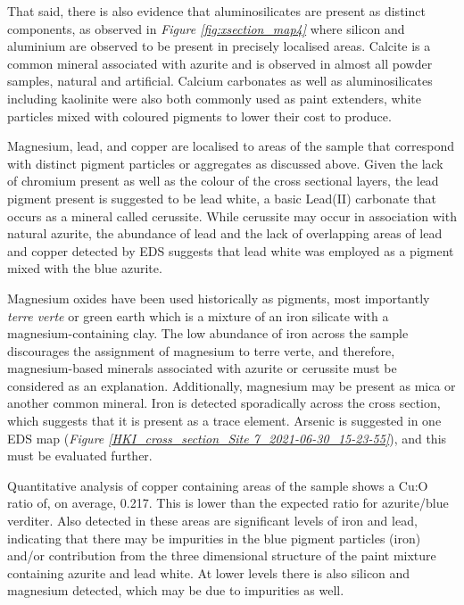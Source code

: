 That said, there is also evidence that aluminosilicates are present as distinct components, as observed in \textit{Figure \ref{fig:xsection_map4}} where silicon and aluminium are observed to be present in precisely localised areas. Calcite is a common mineral associated with azurite and is observed in almost all powder samples, natural and artificial. Calcium carbonates as well as aluminosilicates including kaolinite were also both commonly used as paint extenders, white particles mixed with coloured pigments to lower their cost to produce.~\autocite{encyclopedia}

Magnesium, lead, and copper are localised to areas of the sample that correspond with distinct pigment particles or aggregates as discussed above. Given the lack of chromium present as well as the colour of the cross sectional layers, the lead pigment present is suggested to be lead white, a basic Lead(II) carbonate that occurs as a mineral called cerussite. While cerussite may occur in association with natural azurite,\autocite{Aru} the abundance of lead and the lack of overlapping areas of lead and copper detected by EDS suggests that lead white was employed as a pigment mixed with the blue azurite.

Magnesium oxides have been used historically as pigments, most importantly \textit{terre verte} or green earth which is a mixture of an iron silicate with a magnesium-containing clay. The low abundance of iron across the sample discourages the assignment of magnesium to terre verte, and therefore, magnesium-based minerals associated with azurite or cerussite must be considered as an explanation. Additionally, magnesium may be present as mica or another common mineral. Iron is detected sporadically across the cross section, which suggests that it is present as a trace element. Arsenic is suggested in one EDS map (\textit{Figure \ref{HKI_cross_section_Site 7_2021-06-30_15-23-55}}), and this must be evaluated further.

Quantitative analysis of copper containing areas of the sample shows a Cu:O ratio of, on average, 0.217. This is lower than the expected ratio for azurite/blue verditer. Also detected in these areas are significant levels of iron and lead, indicating that there may be impurities in the blue pigment particles (iron) and/or contribution from the three dimensional structure of the paint mixture containing azurite and lead white. At lower levels there is also silicon and magnesium detected, which may be due to impurities as well. 

